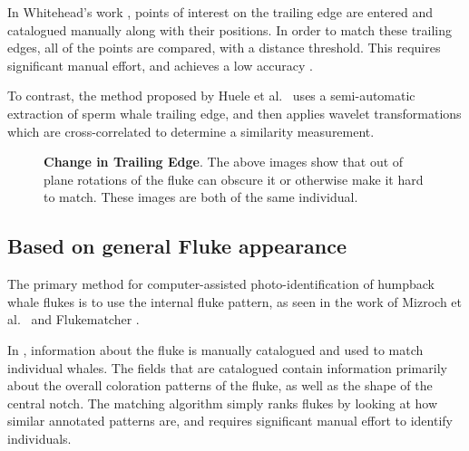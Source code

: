 In Whitehead's work \cite{whitehead1990computer}, points of interest on the trailing edge are entered and catalogued manually along with their positions.
In order to match these trailing edges, all of the points are compared, with a distance threshold.
This requires significant manual effort, and achieves a low accuracy \cite{beekmans2005comparison}.

To contrast, the method proposed by Huele et al.\ \cite{huele2000finding} uses a semi-automatic extraction of sperm whale trailing edge, and then applies wavelet transformations which are cross-correlated to determine a similarity measurement.

\begin{figure}[t]%
\centering
{}
\newline
{}
\caption[]{\textbf{Change in Trailing Edge}. The above images show that out of plane rotations of the fluke can obscure it or otherwise make it hard to match. These images are both of the same individual.}
\label{fig:unclear_te}
\end{figure}

\subsection{Based on general Fluke appearance}


The primary method for computer-assisted photo-identification of humpback whale flukes is to use the internal fluke pattern, as seen in the work of Mizroch et al.\ \cite{mizroch1990computer} and Flukematcher \cite{kniest2010fluke}. 

In \cite{mizroch1990computer}, information about the fluke is manually catalogued and used to match individual whales. 
The fields that are catalogued contain information primarily about the overall coloration patterns of the fluke, as well as the shape of the central notch. 
The matching algorithm simply ranks flukes by looking at how similar annotated patterns are, and requires significant manual effort to identify individuals.

